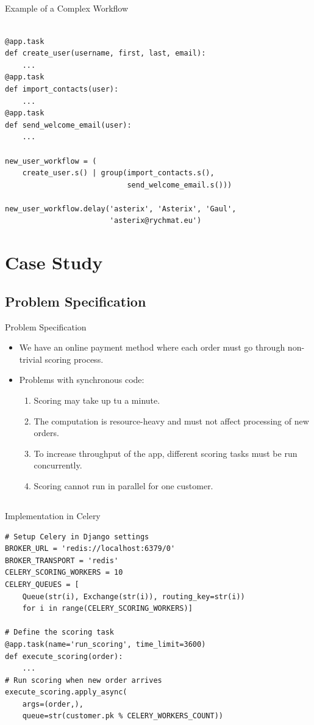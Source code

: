 \documentclass[xcolor=x11names,compress,t]{beamer}
\renewcommand{\(}{\begin{columns}[T]}
\renewcommand{\)}{\end{columns}}
\newcommand{\<}[1]{\begin{column}{#1}}
\renewcommand{\>}{\end{column}}
\newenvironment{slide}[1]{\subsection{#1} \begin{frame}{#1}}{\end{frame}}
\begin{document}
\subsection{}
\begin{frame}[fragile]{Example of a Complex Workflow}
\begin{verbatim}

@app.task
def create_user(username, first, last, email):
    ...
@app.task
def import_contacts(user):
    ...
@app.task
def send_welcome_email(user):
    ...

new_user_workflow = (
    create_user.s() | group(import_contacts.s(),
                            send_welcome_email.s()))

new_user_workflow.delay('asterix', 'Asterix', 'Gaul', 
                        'asterix@rychmat.eu')
\end{verbatim}
\end{frame} 

\section{Case Study} 
\begin{slide}{Problem Specification}
    \begin{itemize}
        \item We have an online payment method where each order must go through non-trivial scoring process.
        \item Problems with synchronous code:
        \begin{enumerate}
            \item Scoring may take up tu a minute.
            \item The computation is resource-heavy and must not affect processing of new orders.
            \item To increase throughput of the app, different scoring tasks must be run concurrently.
            \item Scoring cannot run in parallel for one customer.
        \end{enumerate}
    \end{itemize}
\end{slide}


\subsection{}
\begin{frame}[fragile]{Implementation in Celery}
\begin{verbatim}
# Setup Celery in Django settings
BROKER_URL = 'redis://localhost:6379/0'
BROKER_TRANSPORT = 'redis'
CELERY_SCORING_WORKERS = 10
CELERY_QUEUES = [
    Queue(str(i), Exchange(str(i)), routing_key=str(i)) 
    for i in range(CELERY_SCORING_WORKERS)]

# Define the scoring task
@app.task(name='run_scoring', time_limit=3600)
def execute_scoring(order):
    ...
# Run scoring when new order arrives
execute_scoring.apply_async(
    args=(order,),
    queue=str(customer.pk % CELERY_WORKERS_COUNT))
\end{verbatim}
\end{frame}
\end{document}
